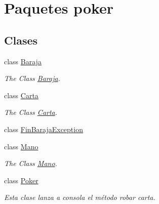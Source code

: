 \hypertarget{namespacepoker}{}\section{Paquetes poker}
\label{namespacepoker}
\subsection*{Clases}
\begin{DoxyCompactItemize}
\item 
class \mbox{\hyperlink{classpoker_1_1Baraja}{Baraja}}
\begin{DoxyCompactList}\small\item\em The Class \mbox{\hyperlink{classpoker_1_1Baraja}{Baraja}}. \end{DoxyCompactList}\item 
class \mbox{\hyperlink{classpoker_1_1Carta}{Carta}}
\begin{DoxyCompactList}\small\item\em The Class \mbox{\hyperlink{classpoker_1_1Carta}{Carta}}. \end{DoxyCompactList}\item 
class \mbox{\hyperlink{classpoker_1_1FinBarajaException}{Fin\+Baraja\+Exception}}
\item 
class \mbox{\hyperlink{classpoker_1_1Mano}{Mano}}
\begin{DoxyCompactList}\small\item\em The Class \mbox{\hyperlink{classpoker_1_1Mano}{Mano}}. \end{DoxyCompactList}\item 
class \mbox{\hyperlink{classpoker_1_1Poker}{Poker}}
\begin{DoxyCompactList}\small\item\em Esta clase lanza a consola el método robar carta. \end{DoxyCompactList}\end{DoxyCompactItemize}
